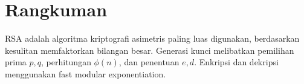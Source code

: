 \section*{Rangkuman}
RSA adalah algoritma kriptografi asimetris paling luas digunakan, berdasarkan kesulitan memfaktorkan bilangan besar. Generasi kunci melibatkan pemilihan prima $p,q$, perhitungan $\phi(n)$, dan penentuan $e,d$. Enkripsi dan dekripsi menggunakan fast modular exponentiation.
